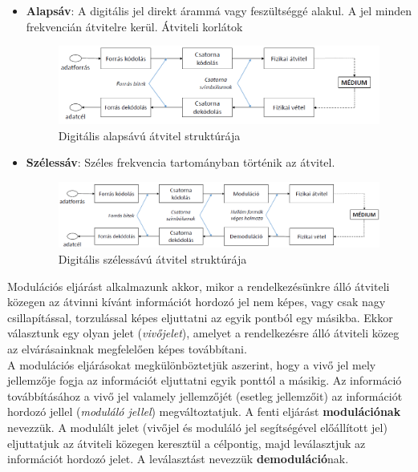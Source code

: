 \documentclass[12pt]{article}
\begin{document}
	\begin{itemize}[leftmargin=7.5mm]
        \renewcommand{\labelitemi}{$\vcenter{\hbox{\tiny$\bullet$}}$}
		\item \textbf{Alapsáv}: A digitális jel direkt árammá vagy feszültséggé alakul. A jel minden frekvencián átvitelre kerül. Átviteli korlátok
		\begin{figure}[H]
			\centering
			\includegraphics[width=1.0\textwidth]{img/alapsav.png}
			\caption{Digitális alapsávú átvitel struktúrája}
		\end{figure}
		\item \textbf{Szélessáv}: Széles frekvencia tartományban történik az átvitel.
		\begin{figure}[H]
			\centering
			\includegraphics[width=1.0\textwidth]{img/szelessav.png}
			\caption{Digitális szélessávú átvitel struktúrája}
		\end{figure}
    \end{itemize}
    \noindent Modulációs eljárást alkalmazunk akkor, mikor a rendelkezésünkre álló átviteli közegen az átvinni kívánt információt hordozó jel nem képes, vagy csak nagy csillapítással, torzulással képes eljuttatni az egyik pontból egy másikba. Ekkor választunk egy olyan jelet (\emph{vivőjelet}), amelyet a rendelkezésre álló átviteli közeg az elvárásainknak megfelelően képes továbbítani.\\

    \noindent A modulációs eljárásokat megkülönböztetjük aszerint, hogy a vivő jel mely jellemzője fogja az információt eljuttatni egyik ponttól a másikig. Az információ továbbításához a vivő jel valamely jellemzőjét (esetleg jellemzőit) az információt hordozó jellel (\emph{moduláló jellel}) megváltoztatjuk. A fenti eljárást \textbf{modulációnak} nevezzük. A modulált jelet (vivőjel és moduláló jel segítségével előállított jel) eljuttatjuk az átviteli közegen keresztül a célpontig, majd leválasztjuk az információt hordozó jelet. A leválasztást nevezzük \textbf{demoduláció}nak.
\end{document}

